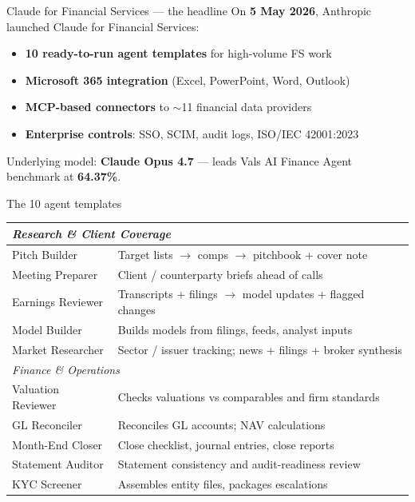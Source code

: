 \documentclass[11pt,aspectratio=169]{beamer}
\newcommand{\hl}[1]{\textbf{\textcolor{accentpurple}{#1}}}
\begin{document}
\begin{frame}{Claude for Financial Services --- the headline}
  On \hl{5 May 2026}, Anthropic launched Claude for Financial Services:
  \begin{itemize}
    \item \textbf{10 ready-to-run agent templates} for high-volume FS work
    \item \textbf{Microsoft 365 integration} (Excel, PowerPoint, Word, Outlook)
    \item \textbf{MCP-based connectors} to $\sim$11 financial data providers
    \item \textbf{Enterprise controls}: SSO, SCIM, audit logs, ISO/IEC 42001:2023
  \end{itemize}
  \vfill
  Underlying model: \hl{Claude Opus 4.7} --- leads Vals AI Finance Agent benchmark at \hl{64.37\%}.
\end{frame}

\begin{frame}{The 10 agent templates}
  \centering\footnotesize
  \begin{tabular}{lp{}}
    \toprule
    \multicolumn{2}{l}{\textit{Research \& Client Coverage}} \\
    \midrule
    Pitch Builder       & Target lists $\rightarrow$ comps $\rightarrow$ pitchbook + cover note \\
    Meeting Preparer    & Client / counterparty briefs ahead of calls \\
    Earnings Reviewer   & Transcripts + filings $\rightarrow$ model updates + flagged changes \\
    Model Builder       & Builds models from filings, feeds, analyst inputs \\
    Market Researcher   & Sector / issuer tracking; news + filings + broker synthesis \\
    \midrule
    \multicolumn{2}{l}{\textit{Finance \& Operations}} \\
    \midrule
    Valuation Reviewer  & Checks valuations vs comparables and firm standards \\
    GL Reconciler       & Reconciles GL accounts; NAV calculations \\
    Month-End Closer    & Close checklist, journal entries, close reports \\
    Statement Auditor   & Statement consistency and audit-readiness review \\
    KYC Screener        & Assembles entity files, packages escalations \\
    \bottomrule
  \end{tabular}
\end{frame}
\end{document}
